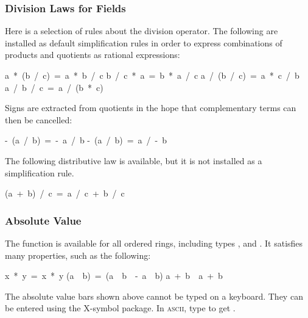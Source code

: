 \subsubsection{Division Laws for Fields}

Here is a selection of rules about the division operator.  The following
are installed as default simplification rules in order to express
combinations of products and quotients as rational expressions:
\begin{isabelle}
a\ *\ (b\ /\ c)\ =\ a\ *\ b\ /\ c
\isanewline
b\ /\ c\ *\ a\ =\ b\ *\ a\ /\ c
\isanewline
a\ /\ (b\ /\ c)\ =\ a\ *\ c\ /\ b
\isanewline
a\ /\ b\ /\ c\ =\ a\ /\ (b\ *\ c)
\end{isabelle}

Signs are extracted from quotients in the hope that complementary terms can
then be cancelled:
\begin{isabelle}
-\ (a\ /\ b)\ =\ -\ a\ /\ b
\isanewline
-\ (a\ /\ b)\ =\ a\ /\ -\ b
\end{isabelle}

The following distributive law is available, but it is not installed as a
simplification rule.
\begin{isabelle}
(a\ +\ b)\ /\ c\ =\ a\ /\ c\ +\ b\ /\ c%
\end{isabelle}


\subsubsection{Absolute Value}

The  function  is available for all
ordered rings, including types ,  and .
It satisfies many properties,
such as the following:
\begin{isabelle}
\isasymbar x\ *\ y\isasymbar \ =\ \isasymbar x\isasymbar \ *\ \isasymbar y\isasymbar
{}\isanewline
(\isasymbar a\isasymbar \ \isasymle \ b)\ =\ (a\ \isasymle \ b\ \isasymand \ -\ a\ \isasymle \ b)
\isanewline
\isasymbar a\ +\ b\isasymbar \ \isasymle \ \isasymbar a\isasymbar \ +\ \isasymbar b\isasymbar
{}
\end{isabelle}

\begin{warn}
The absolute value bars shown above cannot be typed on a keyboard.  They
can be entered using the X-symbol package.  In \textsc{ascii}, type  to
get .
\end{warn}


